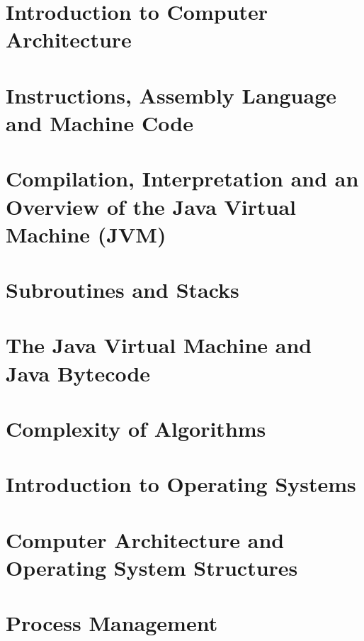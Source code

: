 \documentclass[
  11pt,
  a4paper,
]{article}
\begin{document}
\section{Introduction to Computer Architecture}


\section{Instructions, Assembly Language and Machine Code}


\section[Compilation, Interpretation and the JVM]{Compilation, Interpretation and an Overview of the Java Virtual Machine (JVM)}


\section{Subroutines and Stacks}


\section[The JVM and Java Bytecode]{The Java Virtual Machine and Java Bytecode}


\section{Complexity of Algorithms}



\section{Introduction to Operating Systems}


\section[Computer Architecture and OS Structures]{Computer Architecture and Operating System Structures}


\section{Process Management}

\end{document}
